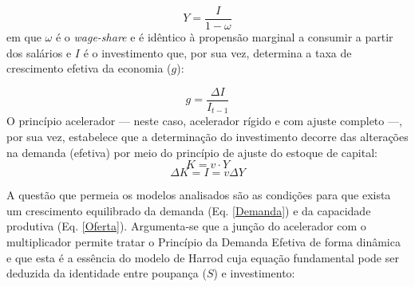 \begin{equation}
\label{Demanda}
Y = \frac{I}{1-\omega}
\end{equation}
em que $\omega$ é o \textit{wage-share} e é idêntico à propensão marginal a consumir a partir dos salários e $I$ é o investimento que, por sua vez, determina a taxa de crescimento efetiva da economia ($g$):

\begin{equation}
\label{crescimento_efetivo}
	g = \frac{\Delta I}{I_{t-1}}
\end{equation}
O princípio acelerador --- neste caso, acelerador rígido e com ajuste completo ---, por sua vez, estabelece que a determinação do investimento decorre das alterações na demanda (efetiva) por meio do princípio de ajuste do estoque de capital:
$$
K = v\cdot Y
$$
\begin{equation}
\Delta K = I = v\Delta Y
\end{equation}


A questão que permeia os modelos analisados são as condições para que exista um crescimento equilibrado da demanda (Eq. \ref{Demanda}) e da capacidade produtiva (Eq. \ref{Oferta}). 
Argumenta-se que a junção do acelerador com o multiplicador permite tratar o Princípio da Demanda Efetiva de forma dinâmica e que esta é a essência do modelo de Harrod cuja equação fundamental pode ser deduzida da identidade entre poupança ($S$) e investimento:

